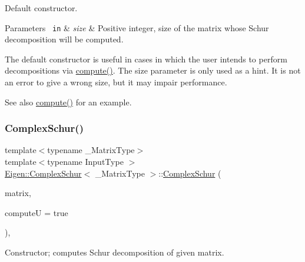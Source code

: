Default constructor. 


\begin{DoxyParams}[1]{Parameters}
\mbox{\texttt{ in}}  & {\em size} & Positive integer, size of the matrix whose Schur decomposition will be computed.\\
\hline
\end{DoxyParams}
The default constructor is useful in cases in which the user intends to perform decompositions via \mbox{\hyperlink{class_eigen_1_1_complex_schur_a3543d2c286563108cd9ace672bbb1c09}{compute()}}. The {\ttfamily size} parameter is only used as a hint. It is not an error to give a wrong {\ttfamily size}, but it may impair performance.

\begin{DoxySeeAlso}{See also}
\mbox{\hyperlink{class_eigen_1_1_complex_schur_a3543d2c286563108cd9ace672bbb1c09}{compute()}} for an example. 
\end{DoxySeeAlso}
\mbox{\label{class_eigen_1_1_complex_schur_a9c92c6e4c33890d2d063c5c8dd22777d}} 
\subsubsection{\texorpdfstring{ComplexSchur()}{ComplexSchur()}\hspace{0.1cm}{\footnotesize\ttfamily [2/2]}}
{\footnotesize\ttfamily template$<$typename \+\_\+\+Matrix\+Type$>$ \\
template$<$typename Input\+Type $>$ \\
\mbox{\hyperlink{class_eigen_1_1_complex_schur}{Eigen\+::\+Complex\+Schur}}$<$ \+\_\+\+Matrix\+Type $>$\+::\mbox{\hyperlink{class_eigen_1_1_complex_schur}{Complex\+Schur}} (\begin{DoxyParamCaption}\item[{const \mbox{\hyperlink{struct_eigen_1_1_eigen_base}{Eigen\+Base}}$<$ Input\+Type $>$ \&}]{matrix,  }\item[{bool}]{computeU = {\ttfamily true} }\end{DoxyParamCaption})\hspace{0.3cm}{\ttfamily [inline]}, {\ttfamily [explicit]}}



Constructor; computes Schur decomposition of given matrix. 


